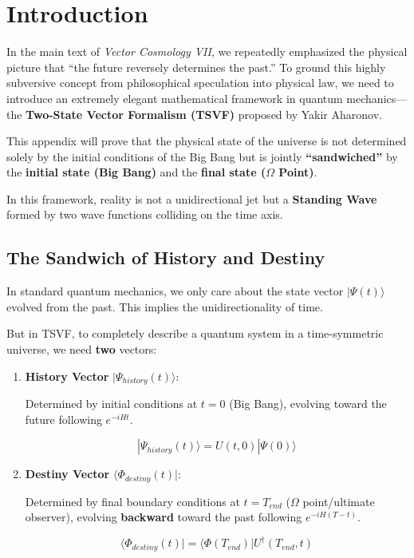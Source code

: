 \section{Introduction}

In the main text of \textit{Vector Cosmology VII}, we repeatedly emphasized the physical picture that ``the future reversely determines the past.'' To ground this highly subversive concept from philosophical speculation into physical law, we need to introduce an extremely elegant mathematical framework in quantum mechanics---the \textbf{Two-State Vector Formalism (TSVF)} proposed by Yakir Aharonov.

This appendix will prove that the physical state of the universe is not determined solely by the initial conditions of the Big Bang but is jointly \textbf{``sandwiched''} by the \textbf{initial state (Big Bang)} and the \textbf{final state ($\Omega$ Point)}.

In this framework, reality is not a unidirectional jet but a \textbf{Standing Wave} formed by two wave functions colliding on the time axis.

\subsection{The Sandwich of History and Destiny}

In standard quantum mechanics, we only care about the state vector $|\Psi(t)\rangle$ evolved from the past. This implies the unidirectionality of time.

But in TSVF, to completely describe a quantum system in a time-symmetric universe, we need \textbf{two} vectors:

\begin{enumerate}
\item \textbf{History Vector} $|\Psi_{history}(t)\rangle$:

Determined by initial conditions at $t=0$ (Big Bang), evolving toward the future following $e^{-iHt}$.

\[|\Psi_{history}(t)\rangle = U(t, 0) |\Psi(0)\rangle\]

\item \textbf{Destiny Vector} $\langle \Phi_{destiny}(t)|$:

Determined by final boundary conditions at $t=T_{end}$ ($\Omega$ point/ultimate observer), evolving \textbf{backward} toward the past following $e^{-iH(T-t)}$.

\[\langle \Phi_{destiny}(t)| = \langle \Phi(T_{end})| U^\dagger(T_{end}, t)\]
\end{enumerate}


